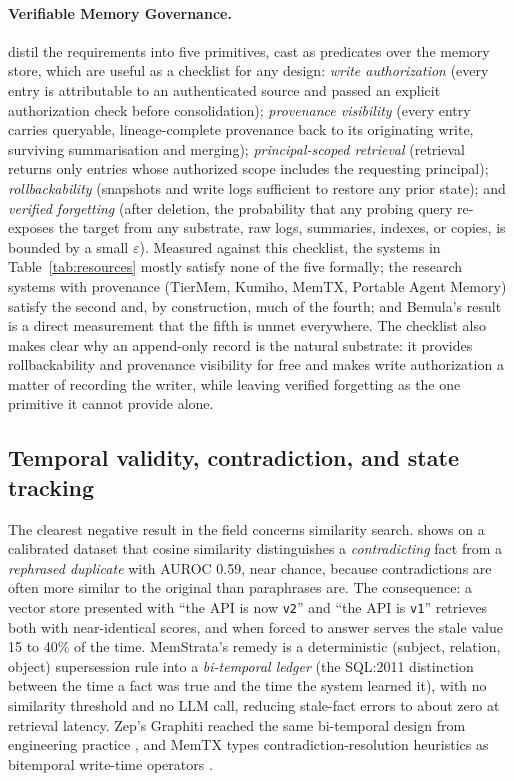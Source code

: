 \documentclass[11pt]{article}
\begin{document}
\paragraph{Verifiable Memory Governance.} \citet{lin2026security} distil the requirements into five primitives, cast as predicates over the memory store, which are useful as a checklist for any design: \emph{write authorization} (every entry is attributable to an authenticated source and passed an explicit authorization check before consolidation); \emph{provenance visibility} (every entry carries queryable, lineage-complete provenance back to its originating write, surviving summarisation and merging); \emph{principal-scoped retrieval} (retrieval returns only entries whose authorized scope includes the requesting principal); \emph{rollbackability} (snapshots and write logs sufficient to restore any prior state); and \emph{verified forgetting} (after deletion, the probability that any probing query re-exposes the target from any substrate, raw logs, summaries, indexes, or copies, is bounded by a small $\varepsilon$). Measured against this checklist, the systems in Table~\ref{tab:resources} mostly satisfy none of the five formally; the research systems with provenance (TierMem, Kumiho, MemTX, Portable Agent Memory) satisfy the second and, by construction, much of the fourth; and Bemula's result is a direct measurement that the fifth is unmet everywhere. The checklist also makes clear why an append-only record is the natural substrate: it provides rollbackability and provenance visibility for free and makes write authorization a matter of recording the writer, while leaving verified forgetting as the one primitive it cannot provide alone.

\subsection{Temporal validity, contradiction, and state tracking}
\label{sec:temporal}

The clearest negative result in the field concerns similarity search. \citet{yadav2026memstrata} shows on a calibrated dataset that cosine similarity distinguishes a \emph{contradicting} fact from a \emph{rephrased duplicate} with AUROC 0.59, near chance, because contradictions are often more similar to the original than paraphrases are. The consequence: a vector store presented with ``the API is now \texttt{v2}'' and ``the API is \texttt{v1}'' retrieves both with near-identical scores, and when forced to answer serves the stale value 15 to 40\% of the time. MemStrata's remedy is a deterministic (subject, relation, object) supersession rule into a \emph{bi-temporal ledger} (the SQL:2011 distinction between the time a fact was true and the time the system learned it), with no similarity threshold and no LLM call, reducing stale-fact errors to about zero at retrieval latency. Zep's Graphiti reached the same bi-temporal design from engineering practice \citep{rasmussen2025zep}, and MemTX types contradiction-resolution heuristics as bitemporal write-time operators \citep{li2026memtx}.
\end{document}
